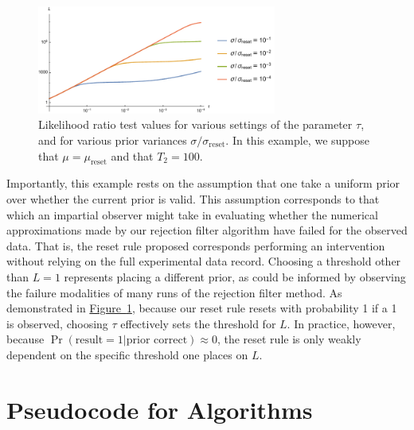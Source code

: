 \documentclass[aps,pra,amsmath,twocolumn,amssymb,superscriptaddress]{revtex4-1}
\newcommand{\reset}{\mathrm{reset}}
\newcommand{\fig}[1]{\hyperref[fig:#1]{Figure~\ref*{fig:#1}}}
\begin{document}
\begin{figure}
    \begin{center}
        \includegraphics[width=0.7\textwidth]{reset-bf-thresholds.pdf}
    \end{center}
    \caption{
        \label{fig:reset-bf-thresholds}
        Likelihood ratio test values for various settings of the parameter
        $\tau$, and for various prior variances $\sigma / \sigma_\reset$.
        In this example, we suppose that $\mu = \mu_\reset$ and that $T_2 = 100$.
    }
\end{figure}

Importantly, this example rests on the assumption that one take a uniform
prior over whether the current prior is valid. This assumption corresponds to
that which an impartial observer might take in evaluating whether the numerical
approximations made by our rejection filter algorithm have failed for the
observed data. That is, the reset rule proposed corresponds performing an intervention
without relying on the full experimental data record. Choosing a threshold
other than $L = 1$ represents placing a different prior, as could be informed by observing
the failure modalities of many runs of the rejection filter method. As
demonstrated in \fig{reset-bf-thresholds}, because our reset rule resets with
probability 1 if a 1 is observed, choosing $\tau$ effectively sets the threshold
for $L$.
In practice,
however, because $\Pr(\text{result} = 1 | \text{prior correct}) \approx 0$, the reset
rule is only weakly dependent on the specific threshold one places on $L$.


\section{Pseudocode for Algorithms}
\label{app:pseudocode}
\end{document}
